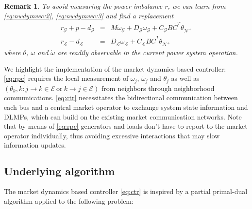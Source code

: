 \documentclass[journal,12pt,onecolumn,draftclsnofoot]{IEEEtran}
\newtheorem{remark}{Remark}
\begin{document}
\begin{remark}
	To avoid measuring the power imbalance $r$, we can learn from \eqref{eq:nwdymvec:2}, \eqref{eq:nwdymvec:3} and find a replacement 
\begin{subequations}
	\begin{eqnarray}
	 r_\mathcal{G} +p  - d_\mathcal{G}  & = & M \dot \omega_\mathcal{G}    + D_\mathcal{G}  \omega_\mathcal{G}  + C_{\mathcal{G}}B  \bar C^T \theta_{\mathcal{N}^+}   \\
	 r_{\mathcal{L}} - d_{\mathcal{L}} & =& D_{\mathcal{L}} \omega_{\mathcal{L}} + C_{\mathcal{L}}B \bar C^T\theta_{\mathcal{N}^+} 
	\end{eqnarray}\label{eq:rpc}
\end{subequations}
where $\theta$, $\omega$ and $\dot \omega$ are readily observable in the current power system operation.
\end{remark}  

We highlight the implementation of the market dynamics based controller: \eqref{eq:rpc} requires the local measurement of $\omega_j$, $\dot \omega_j$ and $\theta_j$ as well as $(\theta_k, k: j\rightarrow k \in\mathcal{E}~\mathrm{or}~k\rightarrow j \in\mathcal{E})$ from neighbors through neighborhood communications. \eqref{eq:ctr} necessitates the bidirectional communication between each bus and a central market operator to exchange system state information and DLMPs, which can build on the existing market communication networks. Note that by means of \eqref{eq:rpc} generators and loads don't have to report to the market operator individually, thus avoiding excessive interactions that may slow information updates.




\subsection{Underlying algorithm} 

The market dynamics based controller \eqref{eq:ctr} is inspired by a partial primal-dual algorithm applied to the following problem:
\end{document}
